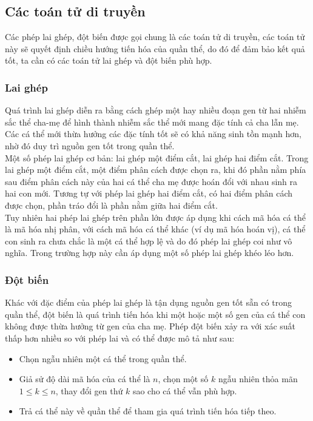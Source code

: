 \subsection{Các toán tử di truyền }
Các phép lai ghép, đột biến được gọi chung là các toán tử di truyền, các toán tử này sẽ quyết định chiều hướng tiến hóa của quần thể, do đó để đảm bảo kết quả tốt, ta cần có các toán tử lai ghép và đột biến phù hợp.
\subsubsection{Lai ghép}
Quá trình lai ghép diễn ra bằng cách ghép một hay nhiều đoạn gen từ hai nhiễm sắc thể cha-mẹ để hình thành nhiễm sắc thể mới mang đặc tính cả cha lẫn mẹ. Các cá thể mới thừa hưởng các đặc tính tốt sẽ có khả năng sinh tồn mạnh hơn, nhờ đó duy trì nguồn gen tốt trong quần thể.
\\Một số phép lai ghép cơ bản: lai ghép một điểm cắt, lai ghép hai điểm cắt.
Trong lai ghép một điểm cắt, một điểm phân cách được chọn ra, khi đó phần nằm phía sau điểm phân cách này của hai cá thể cha mẹ được hoán đổi với nhau sinh ra hai con mới. Tương tự với phép lai ghép hai điểm cắt, có hai điểm phân cách được chọn, phần tráo đổi là phần nằm giữa hai điểm cắt. 
\\Tuy nhiên hai phép lai ghép trên phần lớn được áp dụng khi cách mã hóa cá thể là mã hóa nhị phân, với cách mã hóa cá thể khác (ví dụ mã hóa hoán vị), cá thể con sinh ra chưa chắc là một cá thể hợp lệ và do đó phép lai ghép coi như vô nghĩa. Trong trường hợp này cần áp dụng một số phép lai ghép khéo léo hơn.
\subsubsection{Đột biến}
Khác với đặc điểm của phép lai ghép là tận dụng nguồn gen tốt sẵn có trong quần thể, đột biến là quá trình tiến hóa khi một hoặc một số gen của cá thể con không được thừa hưởng từ gen của cha mẹ. Phép đột biến xảy ra với xác suất thấp hơn nhiều so với phép lai và có thể được mô tả như sau: 
\begin{itemize}
    \item Chọn ngẫu nhiên một cá thể trong quần thể.
    \item Giả sử độ dài mã hóa của cá thể là $n$, chọn một số $k$ ngẫu nhiên thỏa mãn $1 \leq k \leq n$, thay đổi gen thứ $k$ sao cho cá thể vẫn phù hợp.
    \item Trả cá thể này về quần thể để tham gia quá trình tiến hóa tiếp theo.
\end{itemize}
